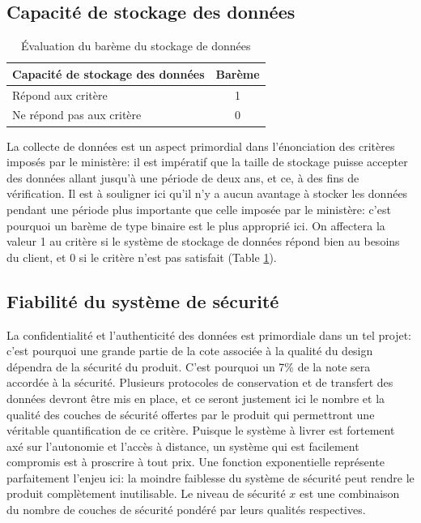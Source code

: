\subsection{Capacité de stockage des données}

\begin{table}
   \begin{tabular}{|p{4cm}|c|}
        \hline
        Capacité de stockage des données & Barème\\
        \hline
        Répond aux critère & 1 \\
        \hline
        Ne répond pas aux critère & 0 \\
        \hline
   \end{tabular}
   \caption{Évaluation du barème du stockage de données}
   \label{t:bareme_stockage}
\end{table}

La collecte de données est un aspect primordial dans l'énonciation des critères imposés par le ministère: il est impératif que la taille de stockage puisse accepter des données allant jusqu'à une période de deux ans, et ce, à des fins de vérification. Il est à souligner ici qu'il n'y a aucun avantage à stocker les données pendant une période plus importante que celle imposée par le ministère: c'est pourquoi un barème de type binaire est le plus approprié ici. On affectera la valeur 1 au critère si le système de stockage de données répond bien au besoins du client, et 0 si le critère n'est pas satisfait (Table \ref{t:bareme_stockage}).

\subsection{Fiabilité du système de sécurité}


La confidentialité et l'authenticité des données est primordiale dans un tel projet: c'est pourquoi une grande partie de la cote associée à la qualité du design dépendra de la sécurité du produit. C'est pourquoi un 7\% de la note sera accordée à la sécurité. Plusieurs protocoles de conservation et de transfert des données devront être mis en place, et ce seront justement ici le nombre et la qualité des couches de sécurité offertes par le produit qui permettront une véritable quantification de ce critère. Puisque le système à livrer est fortement axé sur l'autonomie et l'accès à distance, un système qui est facilement compromis est à proscrire à tout prix. Une fonction exponentielle représente parfaitement l'enjeu ici: la moindre faiblesse du système de sécurité peut rendre le produit complètement inutilisable. Le niveau de sécurité $x$ est une combinaison du nombre de couches de sécurité pondéré par leurs qualités respectives.

